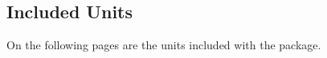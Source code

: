\documentclass{article}
\begin{document}
\clearpage
\subsection{Included Units} %

\label{units:included}
On the following pages are the units included with the package.

\clearpage
{}

\clearpage
{}

\printindex  %
\end{document}
